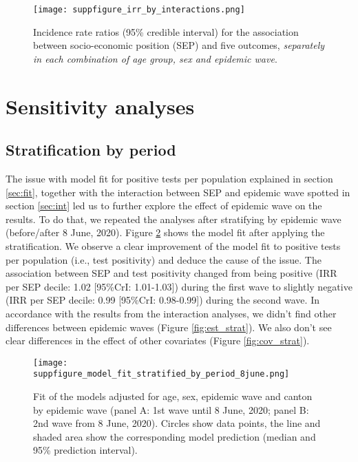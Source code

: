 \documentclass{article}
\begin{document}
	
	\begin{figure}[H]
		\centering
		\texttt{[image: suppfigure\_irr\_by\_interactions.png]}
		\caption{Incidence rate ratios (95\% credible interval) for the association between socio-economic position (SEP) and five outcomes, \textit{separately in each combination of age group, sex and epidemic wave}. }
		\label{fig:slope-cov}
	\end{figure}
	
	\section{Sensitivity analyses}
	\subsection{Stratification by period}
	\label{sec:period}
	
	The issue with model fit for positive tests per population explained in section \ref{sec:fit}, together with the interaction between SEP and epidemic wave spotted in section \ref{sec:int} led us to further explore the effect of epidemic wave on the results.
	To do that, we repeated the analyses after stratifying by epidemic wave (before/after 8 June, 2020).
	Figure \ref{fig:fit_strat} shows the model fit after applying the stratification. We observe a clear improvement of the model fit to positive tests per population (i.e., test positivity) and deduce the cause of the issue.
	The association between SEP and test positivity changed from being positive (IRR per SEP decile: 1.02 [95\%CrI: 1.01-1.03]) during the first wave to slightly negative (IRR per SEP decile: 0.99 [95\%CrI: 0.98-0.99]) during the second wave.
	In accordance with the results from the interaction analyses, we didn't find other differences between epidemic waves (Figure \ref{fig:est_strat}).
	We also don't see clear differences in the effect of other covariates (Figure \ref{fig:cov_strat}).
	

	\begin{figure}[H]
	\centering
	\texttt{[image: suppfigure\_model\_fit\_stratified\_by\_period\_8june.png]}
	\caption{Fit of the models adjusted for age, sex, epidemic wave and canton by epidemic wave (panel A: 1st wave until 8 June, 2020; panel B: 2nd wave from 8 June, 2020). Circles show data points, the line and shaded area show the corresponding model prediction (median and 95\% prediction interval).}
	\label{fig:fit_strat}
\end{figure}
\end{document}
